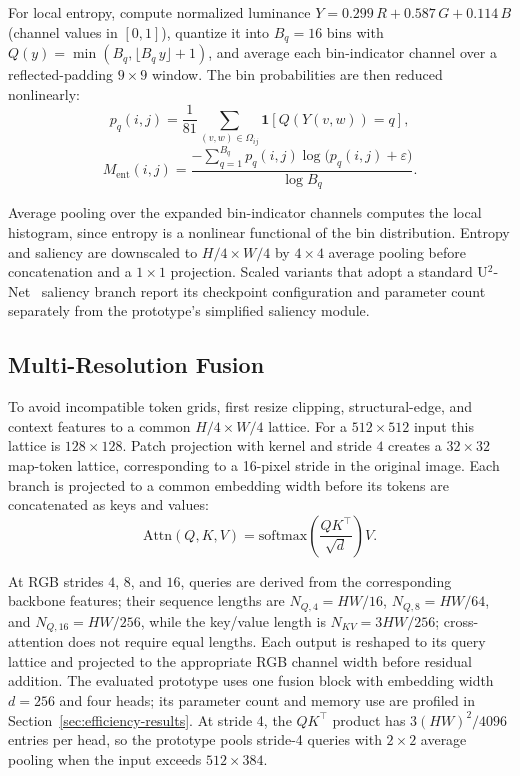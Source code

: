\documentclass[5p,times,twocolumn]{elsarticle}
\begin{document}
For local entropy, compute normalized luminance $Y = 0.299\,R + 0.587\,G +
0.114\,B$ (channel values in $[0, 1]$), quantize it into $B_q = 16$ bins with
$Q(y) = \min(B_q, \lfloor B_q\, y \rfloor + 1)$, and average each bin-indicator
channel over a reflected-padding $9 \times 9$ window. The bin probabilities
are then reduced nonlinearly:
\begin{equation}
p_q(i,j) = \frac{1}{81} \sum_{(v,w) \in \Omega_{ij}}
\mathbf{1}\!\left[Q(Y(v,w)) = q\right],
\label{eq:binprob}
\end{equation}
\begin{equation}
M_{\mathrm{ent}}(i,j) = \frac{-\sum_{q=1}^{B_q} p_q(i,j)
\log\!\big(p_q(i,j)+\varepsilon\big)}{\log B_q}.
\label{eq:entropy}
\end{equation}

Average pooling over the expanded bin-indicator channels computes the local
histogram, since entropy is a nonlinear functional of the bin distribution.
Entropy and saliency are downscaled to $H/4 \times W/4$ by $4{\times}4$
average pooling before concatenation and a $1{\times}1$ projection. Scaled
variants that adopt a standard U$^2$-Net~\cite{qin2020u2net} saliency branch
report its checkpoint configuration and parameter count separately from the
prototype's simplified saliency module.

\subsection{Multi-Resolution Fusion}
\label{sec:fusion}

To avoid incompatible token grids, first resize clipping, structural-edge, and
context features to a common $H/4 \times W/4$ lattice. For a $512 \times 512$
input this lattice is $128 \times 128$. Patch projection with kernel and
stride $4$ creates a $32 \times 32$ map-token lattice, corresponding to a
16-pixel stride in the original image. Each branch is projected to a common
embedding width before its tokens are concatenated as keys and values:
\begin{equation}
\mathrm{Attn}(Q, K, V) = \mathrm{softmax}\!\left(\frac{QK^{\top}}{\sqrt{d}}\right)V.
\label{eq:attn}
\end{equation}

At RGB strides $4$, $8$, and $16$, queries are derived from the corresponding
backbone features; their sequence lengths are $N_{Q,4} = HW/16$,
$N_{Q,8} = HW/64$, and $N_{Q,16} = HW/256$, while the key/value length is
$N_{KV} = 3HW/256$; cross-attention does not require equal lengths. Each
output is reshaped to its query lattice and projected to the appropriate RGB
channel width before residual addition. The evaluated prototype uses one
fusion block with embedding width $d = 256$ and four heads; its parameter
count and memory use are profiled in Section~\ref{sec:efficiency-results}.
At stride 4, the $QK^{\top}$ product has $3(HW)^2/4096$ entries per head, so
the prototype pools stride-4 queries with $2{\times}2$ average pooling when
the input exceeds $512{\times}384$.
\end{document}

